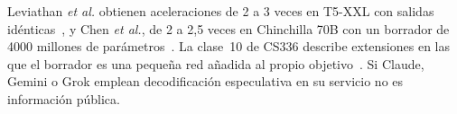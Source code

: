 \addtocounter{definicion}{1}%

\begin{observacion}
Leviathan \emph{et al.} obtienen aceleraciones de 2 a 3 veces en T5-XXL con salidas idénticas~\cite{leviathan}, y Chen \emph{et al.}, de 2 a 2{,}5 veces en Chinchilla 70B con un borrador de 4000 millones de parámetros~\cite{chen}. La clase~10 de CS336 describe extensiones en las que el borrador es una pequeña red añadida al propio objetivo~\cite{cs336}. Si Claude, Gemini o Grok emplean decodificación especulativa en su servicio no es información pública.
\end{observacion}

